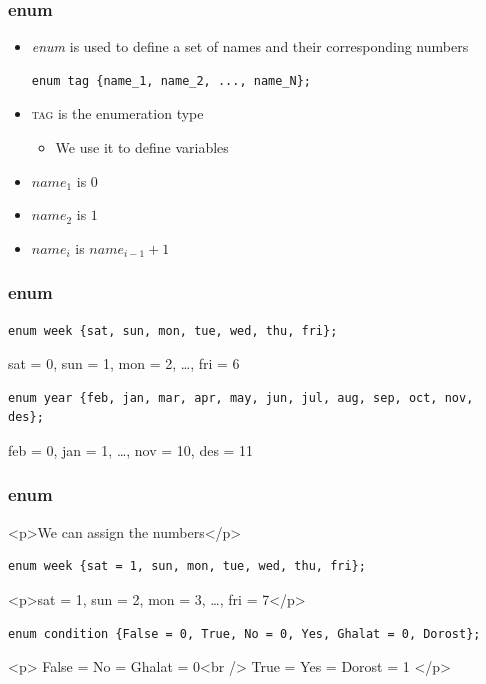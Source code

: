 \documentclass{../c-lecture}
\begin{document}
\begin{frame}[fragile]
  \frametitle{enum}
  \begin{itemize}
    \item
      \textit{\color{LimeGreen} enum} is used to define a set of names and
      their corresponding numbers

    \begin{verbatim}
enum tag {name_1, name_2, ..., name_N};
    \end{verbatim}
    \item \textsc{\color{Yellow} tag} is the enumeration type
    \begin{itemize}
      \item We use it to define variables
    \end{itemize}
    \item
      $name_1$ is $0$
    \item
      $name_2$ is $1$
    \item
      $name_{i}$ is $name_{i-1} + 1$

  \end{itemize}
\end{frame}

\begin{frame}[fragile]
  \frametitle{enum}
  \begin{verbatim}
enum week {sat, sun, mon, tue, wed, thu, fri};
  \end{verbatim}
  sat = 0, sun = 1, mon = 2, \ldots, fri = 6

  \begin{verbatim}
enum year {feb, jan, mar, apr, may, jun, jul, aug, sep, oct, nov, des};
  \end{verbatim}
  feb = 0, jan = 1, \ldots, nov = 10, des = 11
\end{frame}

\begin{frame}[fragile]
  \frametitle{enum}
  <p>We can assign the numbers</p>
  \begin{verbatim}
enum week {sat = 1, sun, mon, tue, wed, thu, fri};
  \end{verbatim}
  <p>sat = 1, sun = 2, mon = 3, …, fri = 7</p>
  \begin{verbatim}
enum condition {False = 0, True, No = 0, Yes, Ghalat = 0, Dorost};
  \end{verbatim}
  <p>
    False = No = Ghalat = 0<br />
    True = Yes = Dorost = 1
  </p>
\end{frame}
\end{document}
